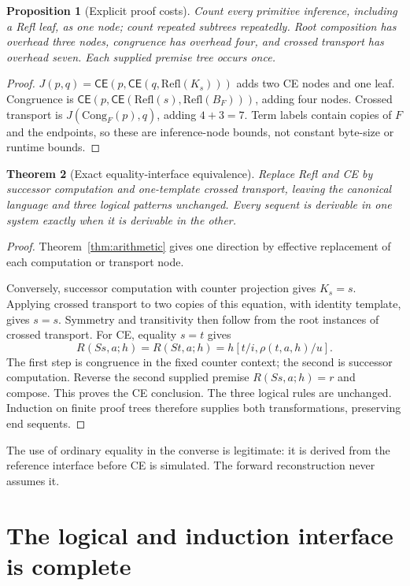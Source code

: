 \documentclass[11pt,letterpaper]{article}
\newtheorem{theorem}{Theorem}[section]
\newtheorem{proposition}[theorem]{Proposition}
\theoremstyle{definition}
\newcommand{\CE}{\mathsf{CE}}
\begin{document}
\begin{proposition}[Explicit proof costs]\label{prop:cost}
Count every primitive inference, including a Refl leaf, as one node;
count repeated subtrees repeatedly. Root composition has overhead
three nodes, congruence has overhead four, and crossed transport has
overhead seven. Each supplied premise tree occurs once.
\end{proposition}
\begin{proof}
$J(p,q)=\CE(p,\CE(q,\mathrm{Refl}(K_s)))$ adds two CE nodes and
one leaf. Congruence is
$\CE(p,\CE(\mathrm{Refl}(s),\mathrm{Refl}(B_F)))$, adding four
nodes. Crossed transport is $J(\mathrm{Cong}_F(p),q)$, adding
$4+3=7$. Term labels contain copies of $F$ and the endpoints, so
these are inference-node bounds, not constant byte-size or runtime bounds.
\end{proof}

\begin{theorem}[Exact equality-interface equivalence]\label{thm:interface}
Replace Refl and CE by successor computation and one-template crossed
transport, leaving the canonical language and three logical patterns
unchanged. Every sequent is derivable in one system exactly when it is
derivable in the other.
\end{theorem}
\begin{proof}
Theorem~\ref{thm:arithmetic} gives one direction by effective replacement
of each computation or transport node.

Conversely, successor computation with counter projection gives
$K_s=s$. Applying crossed transport to two copies of this equation,
with identity template, gives $s=s$. Symmetry and transitivity then
follow from the root instances of crossed transport.
For CE, equality $s=t$ gives
\[
 R(Ss,a;h)=R(St,a;h)
          =h[t/i,\rho(t,a,h)/u].
\]
The first step is congruence in the fixed counter context; the second
is successor computation. Reverse the second supplied premise
$R(Ss,a;h)=r$ and compose. This proves the CE conclusion.
The three logical rules are unchanged. Induction on finite proof trees
therefore supplies both transformations, preserving end sequents.
\end{proof}

The use of ordinary equality in the converse is legitimate: it is
derived from the reference interface before CE is simulated. The
forward reconstruction never assumes it.

\section{The logical and induction interface is complete}
\label{sec:logic}
\end{document}
